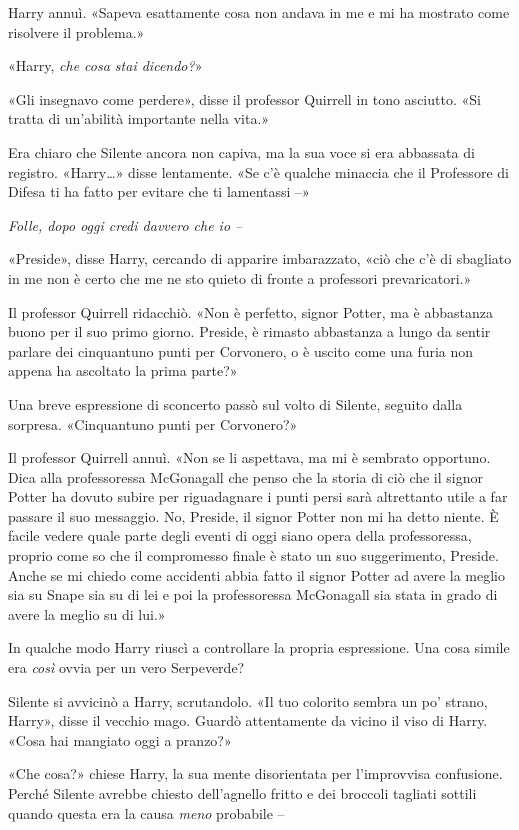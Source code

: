 Harry annuì. «Sapeva esattamente cosa non andava in me e mi ha mostrato come risolvere il problema.»

«Harry, \textit{che cosa stai dicendo?}»

«Gli insegnavo come perdere», disse il professor Quirrell in tono asciutto. «Si tratta di un’abilità importante nella vita.»

Era chiaro che Silente ancora non capiva, ma la sua voce si era abbassata di registro. «Harry…» disse lentamente. «Se c’è qualche minaccia che il Professore di Difesa ti ha fatto per evitare che ti lamentassi –»

\textit{Folle, dopo oggi credi davvero che io –}

«Preside», disse Harry, cercando di apparire imbarazzato, «ciò che c’è di sbagliato in me non è certo che me ne sto quieto di fronte a professori prevaricatori.»

Il professor Quirrell ridacchiò. «Non è perfetto, signor Potter, ma è abbastanza buono per il suo primo giorno. Preside, è rimasto abbastanza a lungo da sentir parlare dei cinquantuno punti per Corvonero, o è uscito come una furia non appena ha ascoltato la prima parte?»

Una breve espressione di sconcerto passò sul volto di Silente, seguito dalla sorpresa. «Cinquantuno punti per Corvonero?»

Il professor Quirrell annuì. «Non se li aspettava, ma mi è sembrato opportuno. Dica alla professoressa McGonagall che penso che la storia di ciò che il signor Potter ha dovuto subire per riguadagnare i punti persi sarà altrettanto utile a far passare il suo messaggio. No, Preside, il signor Potter non mi ha detto niente. È facile vedere quale parte degli eventi di oggi siano opera della professoressa, proprio come so che il compromesso finale è stato un suo suggerimento, Preside. Anche se mi chiedo come accidenti abbia fatto il signor Potter ad avere la meglio sia su Snape sia su di lei e poi la professoressa McGonagall sia stata in grado di avere la meglio su di lui.»

In qualche modo Harry riuscì a controllare la propria espressione. Una cosa simile era \textit{così} ovvia per un vero Serpeverde?

Silente si avvicinò a Harry, scrutandolo. «Il tuo colorito sembra un po’ strano, Harry», disse il vecchio mago. Guardò attentamente da vicino il viso di Harry. «Cosa hai mangiato oggi a pranzo?»

«Che cosa?» chiese Harry, la sua mente disorientata per l’improvvisa confusione. Perché Silente avrebbe chiesto dell’agnello fritto e dei broccoli tagliati sottili quando questa era la causa \textit{meno} probabile –


